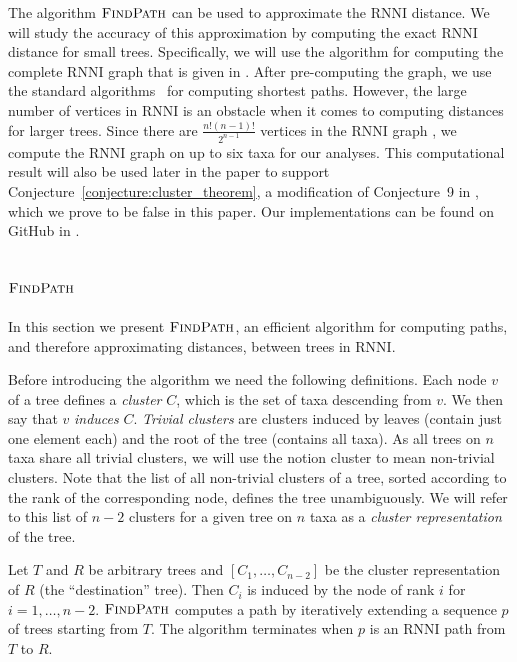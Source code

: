\documentclass{amsart}
\newcommand{\rnni}{\mathrm{RNNI}}
\newcommand{\findpath}{\textsc{FindPath}}
\begin{document}
The algorithm $\findpath$ can be used to approximate the $\rnni$ distance.
We will study the accuracy of this approximation by computing the exact $\rnni$ distance for small trees.
Specifically, we will use the algorithm for computing the complete $\rnni$ graph that is given in \autocite[their Section 3.3]{Gavryushkin2018-ol}.
After pre-computing the graph, we use the standard algorithms~\autocite{Floyd1962-ew,Dijkstra1959-ph} for computing shortest paths.
However, the large number of vertices in $\rnni$ is an obstacle when it comes to computing distances for larger trees.
Since there are $\frac{n!(n-1)!}{2^{n-1}}$ vertices in the $\rnni$ graph \autocite{Gavryushkin2018-ol}, we compute the $\rnni$ graph on up to six taxa for our analyses.
This computational result will also be used later in the paper to support Conjecture~\ref{conjecture:cluster_theorem}, a modification of Conjecture~9 in \autocite{Gavryushkin2018-ol}, which we prove to be false in this paper.
Our implementations can be found on GitHub in \autocite{Collienne2019}.


\subsection{$\findpath$}
\label{section:alg_findpath}

In this section we present $\findpath$, an efficient algorithm for computing paths, and therefore approximating distances, between trees in $\rnni$.

Before introducing the algorithm we need the following definitions.
Each node $v$ of a tree defines a \emph{cluster} $C$, which is the set of taxa descending from $v$.
We then say that $v$ \emph{induces} $C$.
\emph{Trivial clusters} are clusters induced by leaves (contain just one element each) and the root of the tree (contains all taxa).
As all trees on $n$ taxa share all trivial clusters, we will use the notion cluster to mean non-trivial clusters.
Note that the list of all non-trivial clusters of a tree, sorted according to the rank of the corresponding node, defines the tree unambiguously.
We will refer to this list of $n-2$ clusters for a given tree on $n$ taxa as a \emph{cluster representation} of the tree.

Let $T$ and $R$ be arbitrary trees and $[C_1, \ldots, C_{n-2}]$ be the cluster representation of $R$ (the ``destination'' tree).
Then $C_i$ is induced by the node of rank $i$ for $i = 1, \ldots, n-2$.
$\findpath$ computes a path by iteratively extending a sequence $p$ of trees starting from $T$.
The algorithm terminates when $p$ is an $\rnni$ path from $T$ to $R$.
\end{document}
